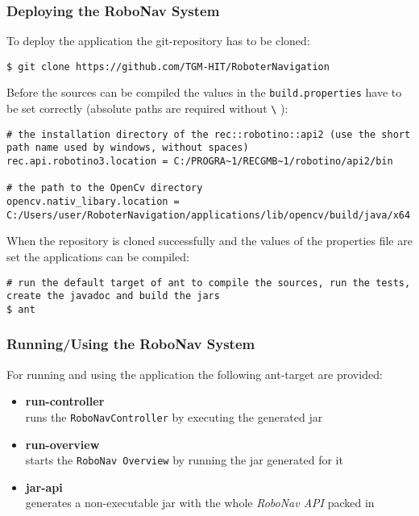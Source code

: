 \subsubsection{Deploying the RoboNav System}
To deploy the application the git-repository has to be cloned:
\begin{lstlisting}[label=clonerepo, caption=Cloning the git-repository]
$ git clone https://github.com/TGM-HIT/RoboterNavigation
\end{lstlisting}
Before the sources can be compiled the values in the \texttt{build.properties} have to be set correctly (absolute paths are required without \texttt{\textbackslash} ):
\begin{lstlisting}[label=setproperties, caption=Setting the properties]
# the installation directory of the rec::robotino::api2 (use the short path name used by windows, without spaces)
rec.api.robotino3.location = C:/PROGRA~1/RECGMB~1/robotino/api2/bin

# the path to the OpenCv directory
opencv.nativ_libary.location = C:/Users/user/RoboterNavigation/applications/lib/opencv/build/java/x64
\end{lstlisting}
When the repository is cloned successfully and the values of the properties file are set the applications can be compiled:
\begin{lstlisting}[label=compileapps, caption=Compiling the applications]
# run the default target of ant to compile the sources, run the tests, create the javadoc and build the jars
$ ant
\end{lstlisting}

\subsubsection{Running/Using the RoboNav System}
For running and using the application the following ant-target are provided:
\begin{itemize}
	\item \textbf{run-controller}\\runs the \texttt{RoboNavController} by executing the generated jar
	\item \textbf{run-overview}\\starts the \texttt{RoboNav Overview} by running the jar generated for it
	\item \textbf{jar-api}\\generates a non-executable jar with the whole \textit{RoboNav API} packed in 
\end{itemize}

